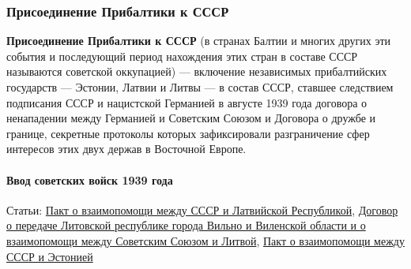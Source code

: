 \documentclass{article}
\begin{document}
\subsubsection{Присоединение Прибалтики к СССР}

\textbf{Присоединение Прибалтики к СССР} (в странах Балтии и многих других эти события и последующий период нахождения этих стран в составе СССР называются советской оккупацией) — включение независимых прибалтийских государств — Эстонии, Латвии и Литвы — в состав СССР, ставшее следствием подписания СССР и нацистской Германией в августе 1939 года договора о ненападении между Германией и Советским Союзом и Договора о дружбе и границе, секретные протоколы которых зафиксировали разграничение сфер интересов этих двух держав в Восточной Европе.

\paragraph{Ввод советских войск 1939 года}

Статьи: \href{https://ru.wikipedia.org/wiki/%D0%9F%D0%B0%D0%BA%D1%82_%D0%BE_%D0%B2%D0%B7%D0%B0%D0%B8%D0%BC%D0%BE%D0%BF%D0%BE%D0%BC%D0%BE%D1%89%D0%B8_%D0%BC%D0%B5%D0%B6%D0%B4%D1%83_%D0%A1%D0%A1%D0%A1%D0%A0_%D0%B8_%D0%9B%D0%B0%D1%82%D0%B2%D0%B8%D0%B9%D1%81%D0%BA%D0%BE%D0%B9_%D0%A0%D0%B5%D1%81%D0%BF%D1%83%D0%B1%D0%BB%D0%B8%D0%BA%D0%BE%D0%B9}{Пакт о взаимопомощи между СССР и Латвийской Республикой}, \href{https://ru.wikipedia.org/wiki/%D0%94%D0%BE%D0%B3%D0%BE%D0%B2%D0%BE%D1%80_%D0%BE_%D0%BF%D0%B5%D1%80%D0%B5%D0%B4%D0%B0%D1%87%D0%B5_%D0%9B%D0%B8%D1%82%D0%BE%D0%B2%D1%81%D0%BA%D0%BE%D0%B9_%D1%80%D0%B5%D1%81%D0%BF%D1%83%D0%B1%D0%BB%D0%B8%D0%BA%D0%B5_%D0%B3%D0%BE%D1%80%D0%BE%D0%B4%D0%B0_%D0%92%D0%B8%D0%BB%D1%8C%D0%BD%D0%BE_%D0%B8_%D0%92%D0%B8%D0%BB%D0%B5%D0%BD%D1%81%D0%BA%D0%BE%D0%B9_%D0%BE%D0%B1%D0%BB%D0%B0%D1%81%D1%82%D0%B8_%D0%B8_%D0%BE_%D0%B2%D0%B7%D0%B0%D0%B8%D0%BC%D0%BE%D0%BF%D0%BE%D0%BC%D0%BE%D1%89%D0%B8_%D0%BC%D0%B5%D0%B6%D0%B4%D1%83_%D0%A1%D0%BE%D0%B2%D0%B5%D1%82%D1%81%D0%BA%D0%B8%D0%BC_%D0%A1%D0%BE%D1%8E%D0%B7%D0%BE%D0%BC_%D0%B8_%D0%9B%D0%B8%D1%82%D0%B2%D0%BE%D0%B9}{Договор о передаче Литовской республике города Вильно и Виленской области и о взаимопомощи между Советским Союзом и Литвой}, \href{https://ru.wikipedia.org/wiki/%D0%9F%D0%B0%D0%BA%D1%82_%D0%BE_%D0%B2%D0%B7%D0%B0%D0%B8%D0%BC%D0%BE%D0%BF%D0%BE%D0%BC%D0%BE%D1%89%D0%B8_%D0%BC%D0%B5%D0%B6%D0%B4%D1%83_%D0%A1%D0%A1%D0%A1%D0%A0_%D0%B8_%D0%AD%D1%81%D1%82%D0%BE%D0%BD%D0%B8%D0%B5%D0%B9}{Пакт о взаимопомощи между СССР и Эстонией}
\end{document}

